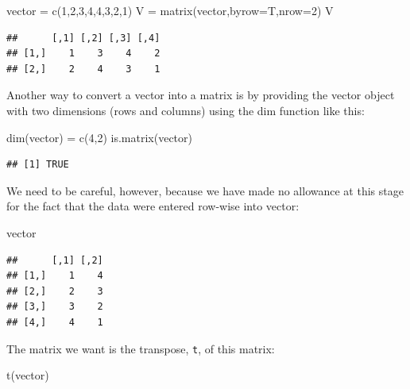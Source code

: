 \documentclass[
]{book}
\newenvironment{Shaded}{\begin{snugshade}}{\end{snugshade}}
\newcommand{\AttributeTok}[1]{\textcolor[rgb]{0.77,0.63,0.00}{#1}}
\newcommand{\DecValTok}[1]{\textcolor[rgb]{0.00,0.00,0.81}{#1}}
\newcommand{\FunctionTok}[1]{\textcolor[rgb]{0.00,0.00,0.00}{#1}}
\newcommand{\NormalTok}[1]{#1}
\newcommand{\OtherTok}[1]{\textcolor[rgb]{0.56,0.35,0.01}{#1}}
\theoremstyle{definition}
\theoremstyle{definition}
\theoremstyle{definition}
\theoremstyle{definition}
\theoremstyle{remark}
\begin{document}
\begin{Shaded}
\begin{Highlighting}[]
\NormalTok{vector }\OtherTok{=} \FunctionTok{c}\NormalTok{(}\DecValTok{1}\NormalTok{,}\DecValTok{2}\NormalTok{,}\DecValTok{3}\NormalTok{,}\DecValTok{4}\NormalTok{,}\DecValTok{4}\NormalTok{,}\DecValTok{3}\NormalTok{,}\DecValTok{2}\NormalTok{,}\DecValTok{1}\NormalTok{)}
\NormalTok{V }\OtherTok{=} \FunctionTok{matrix}\NormalTok{(vector,}\AttributeTok{byrow=}\NormalTok{T,}\AttributeTok{nrow=}\DecValTok{2}\NormalTok{)}
\NormalTok{V}
\end{Highlighting}
\end{Shaded}

\begin{verbatim}
##      [,1] [,2] [,3] [,4]
## [1,]    1    3    4    2
## [2,]    2    4    3    1
\end{verbatim}

Another way to convert a vector into a matrix is by providing the vector object with two dimensions (rows and columns) using the dim function like this:

\begin{Shaded}
\begin{Highlighting}[]
\FunctionTok{dim}\NormalTok{(vector) }\OtherTok{=} \FunctionTok{c}\NormalTok{(}\DecValTok{4}\NormalTok{,}\DecValTok{2}\NormalTok{)}
\FunctionTok{is.matrix}\NormalTok{(vector)}
\end{Highlighting}
\end{Shaded}

\begin{verbatim}
## [1] TRUE
\end{verbatim}

We need to be careful, however, because we have made no allowance at this stage for the fact that the data were entered row-wise into vector:

\begin{Shaded}
\begin{Highlighting}[]
\NormalTok{vector}
\end{Highlighting}
\end{Shaded}

\begin{verbatim}
##      [,1] [,2]
## [1,]    1    4
## [2,]    2    3
## [3,]    3    2
## [4,]    4    1
\end{verbatim}

The matrix we want is the transpose, \texttt{t}, of this matrix:

\begin{Shaded}
\begin{Highlighting}[]
\FunctionTok{t}\NormalTok{(vector)}
\end{Highlighting}
\end{Shaded}
\end{document}
